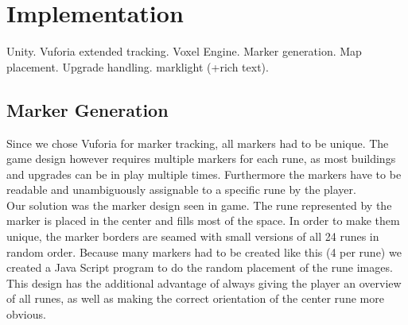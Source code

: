 \section{Implementation}
Unity. Vuforia extended tracking. Voxel Engine. Marker generation. Map placement. Upgrade handling. marklight (+rich text). 

\subsection{Marker Generation}
Since we chose Vuforia for marker tracking, all markers had to be unique. The game design however requires multiple markers for each rune, as most buildings and upgrades can be in play multiple times. Furthermore the markers have to be readable and unambiguously assignable to a specific rune by the player. \\

Our solution was the marker design seen in game. The rune represented by the marker is placed in the center and fills most of the space. In order to make them unique, the marker borders are seamed with small versions of all 24 runes in random order. Because many markers had to be created like this (4 per rune) we created a Java Script program to do the random placement of the rune images. This design has the additional advantage of always giving the player an overview of all runes, as well as making the correct orientation of the center rune more obvious.

